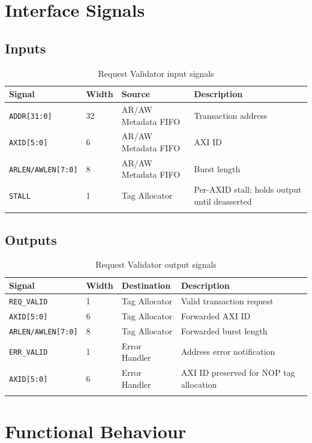 \documentclass[11pt,a4paper]{article}
\begin{document}
\section{Interface Signals}

\subsection{Inputs}

\begin{longtable}{llll}
\toprule
\textbf{Signal} & \textbf{Width} & \textbf{Source} & \textbf{Description} \\
\midrule
\texttt{ADDR[31:0]}        & 32 & AR/AW Metadata FIFO & Transaction address \\
\texttt{AXID[5:0]}         & 6  & AR/AW Metadata FIFO & AXI ID \\
\texttt{ARLEN/AWLEN[7:0]}  & 8  & AR/AW Metadata FIFO & Burst length \\
\texttt{STALL}             & 1  & Tag Allocator       & Per-AXID stall; holds output until deasserted \\
\bottomrule
\caption{Request Validator input signals}
\end{longtable}

\subsection{Outputs}

\begin{longtable}{llll}
\toprule
\textbf{Signal} & \textbf{Width} & \textbf{Destination} & \textbf{Description} \\
\midrule
\texttt{REQ\_VALID}       & 1 & Tag Allocator & Valid transaction request \\
\texttt{AXID[5:0]}        & 6 & Tag Allocator & Forwarded AXI ID \\
\texttt{ARLEN/AWLEN[7:0]} & 8 & Tag Allocator & Forwarded burst length \\
\texttt{ERR\_VALID}       & 1 & Error Handler & Address error notification \\
\texttt{AXID[5:0]}        & 6 & Error Handler & AXI ID preserved for NOP tag allocation \\
\bottomrule
\caption{Request Validator output signals}
\end{longtable}

\section{Functional Behaviour}
\end{document}
